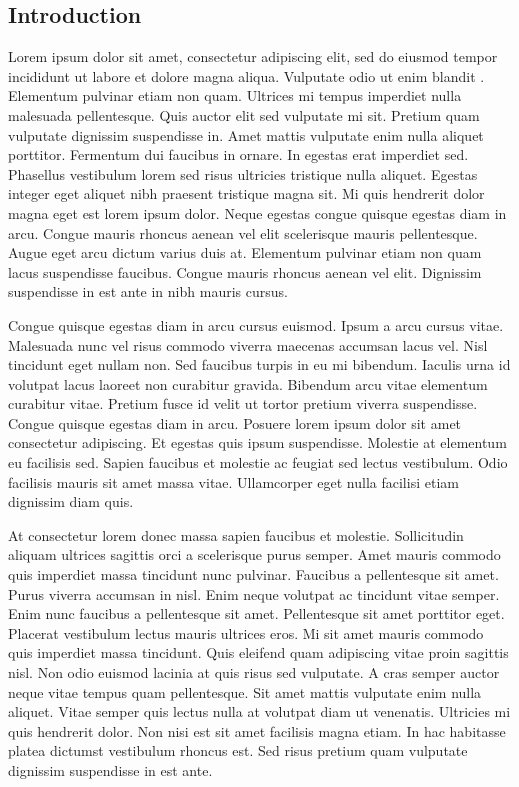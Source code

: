 \documentclass[12pt]{article}
\begin{document}
\pagebreak{}
\begin{spacing}{1.4}

\section{Introduction}

Lorem ipsum dolor sit amet, consectetur adipiscing elit, sed do eiusmod tempor incididunt ut labore et dolore magna aliqua. Vulputate odio ut enim blandit \citep{Arrow1974,Becker2009,Friedman1970}. Elementum pulvinar etiam non quam. Ultrices mi tempus imperdiet nulla malesuada pellentesque. Quis auctor elit sed vulputate mi sit. Pretium quam vulputate dignissim suspendisse in. Amet mattis vulputate enim nulla aliquet porttitor. Fermentum dui faucibus in ornare. In egestas erat imperdiet sed. Phasellus vestibulum lorem sed risus ultricies tristique nulla aliquet. Egestas integer eget aliquet nibh praesent tristique magna sit. Mi quis hendrerit dolor magna eget est lorem ipsum dolor. Neque egestas congue quisque egestas diam in arcu. Congue mauris rhoncus aenean vel elit scelerisque mauris pellentesque. Augue eget arcu dictum varius duis at. Elementum pulvinar etiam non quam lacus suspendisse faucibus. Congue mauris rhoncus aenean vel elit. Dignissim suspendisse in est ante in nibh mauris cursus.

Congue quisque egestas diam in arcu cursus euismod. Ipsum a arcu cursus vitae. Malesuada nunc vel risus commodo viverra maecenas accumsan lacus vel. Nisl tincidunt eget nullam non. Sed faucibus turpis in eu mi bibendum. Iaculis urna id volutpat lacus laoreet non curabitur gravida. Bibendum arcu vitae elementum curabitur vitae. Pretium fusce id velit ut tortor pretium viverra suspendisse. Congue quisque egestas diam in arcu. Posuere lorem ipsum dolor sit amet consectetur adipiscing. Et egestas quis ipsum suspendisse. Molestie at elementum eu facilisis sed. Sapien faucibus et molestie ac feugiat sed lectus vestibulum. Odio facilisis mauris sit amet massa vitae. Ullamcorper eget nulla facilisi etiam dignissim diam quis.

At consectetur lorem donec massa sapien faucibus et molestie. Sollicitudin aliquam ultrices sagittis orci a scelerisque purus semper. Amet mauris commodo quis imperdiet massa tincidunt nunc pulvinar. Faucibus a pellentesque sit amet. Purus viverra accumsan in nisl. Enim neque volutpat ac tincidunt vitae semper. Enim nunc faucibus a pellentesque sit amet. Pellentesque sit amet porttitor eget. Placerat vestibulum lectus mauris ultrices eros. Mi sit amet mauris commodo quis imperdiet massa tincidunt. Quis eleifend quam adipiscing vitae proin sagittis nisl. Non odio euismod lacinia at quis risus sed vulputate. A cras semper auctor neque vitae tempus quam pellentesque. Sit amet mattis vulputate enim nulla aliquet. Vitae semper quis lectus nulla at volutpat diam ut venenatis. Ultricies mi quis hendrerit dolor. Non nisi est sit amet facilisis magna etiam. In hac habitasse platea dictumst vestibulum rhoncus est. Sed risus pretium quam vulputate dignissim suspendisse in est ante.


\end{spacing}
\end{document}
